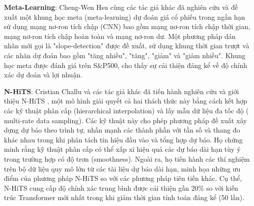 \textbf{Meta-Learning}: Cheng-Wen Hsu cùng các tác giả khác \cite{b5} đã nghiên cứu và đề xuất một khung học meta (meta-learning) dự đoán giá cổ phiếu trong ngắn hạn sử dụng mạng nơ-ron tích chập (CNN) bao gồm mạng nơ-ron tích chập thời gian, mạng nơ-ron tích chập hoàn toàn và mạng nơ-ron dư. Một phương pháp dán nhãn mới gọi là "slope-detection" được đề xuất, sử dụng khung thời gian trượt và các nhãn dự đoán bao gồm "tăng nhiều", "tăng", "giảm" và "giảm nhiều". Khung học meta được đánh giá trên S\&P500, cho thấy sự cải thiện đáng kể về độ chính xác dự đoán và lợi nhuận.
\par
\textbf{N-HiTS}: Cristian Challu và các tác giả khác đã tiến hành nghiên cứu và giới thiệu N-HiTS \cite{b6}, một mô hình giải quyết cả hai thách thức này bằng cách kết hợp các kỹ thuật phân cấp (hierarchical interpolation) và lấy mẫu dữ liệu đa tốc độ ( multi-rate data sampling). Các kỹ thuật này cho phép phương pháp đề xuất xây dựng dự báo theo trình tự, nhấn mạnh các thành phần với tần số và thang đo khác nhau trong khi phân tách tín hiệu đầu vào và tổng hợp dự báo. Họ chứng minh rằng kỹ thuật phân cấp có thể xấp xỉ hiệu quả các dự báo dài hạn tùy ý trong trường hợp có độ trơn (smoothness). Ngoài ra, họ tiến hành các thí nghiệm trên bộ dữ liệu quy mô lớn từ các tài liệu dự báo dài hạn, minh họa những ưu điểm của phương pháp N-HiTS so với các phương pháp tiên tiến khác. Cụ thể, N-HiTS cung cấp độ chính xác trung bình được cải thiện gần 20\% so với kiến trúc Transformer mới nhất trong khi giảm thời gian tính toán đáng kể (50 lần).